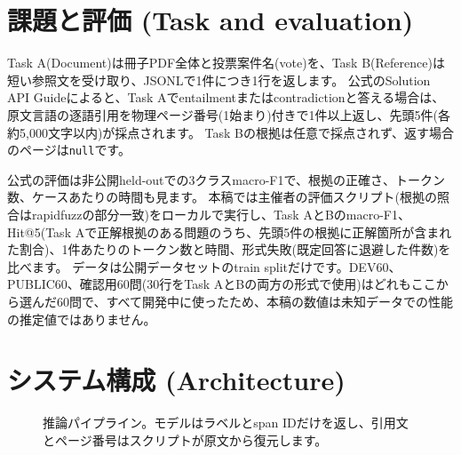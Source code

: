 \documentclass[10pt,a4paper]{ltjsarticle}
\begin{document}
\section{課題と評価 (Task and evaluation)}
\label{sec:eval}

Task A(Document)は冊子PDF全体と投票案件名(vote)を、Task B(Reference)は短い参照文を受け取り、JSONLで1件につき1行を返します。
公式のSolution API Guide\cite{apiguide}によると、Task Aでentailmentまたはcontradictionと答える場合は、原文言語の逐語引用を物理ページ番号(1始まり)付きで1件以上返し、先頭5件(各約5,000文字以内)が採点されます。
Task Bの根拠は任意で採点されず、返す場合のページは\texttt{null}です。

公式の評価は非公開held-outでの3クラスmacro-F1で、根拠の正確さ、トークン数、ケースあたりの時間も見ます\cite{ostchallenge,apiguide}。
本稿では主催者の評価スクリプト(根拠の照合はrapidfuzz\cite{rapidfuzz}の部分一致)をローカルで実行し、Task AとBのmacro-F1、Hit@5(Task Aで正解根拠のある問題のうち、先頭5件の根拠に正解箇所が含まれた割合)、1件あたりのトークン数と時間、形式失敗(既定回答に退避した件数)を比べます。
データは公開データセット\cite{dataset}のtrain splitだけです。DEV60、PUBLIC60、確認用60問(30行をTask AとBの両方の形式で使用)はどれもここから選んだ60問で、すべて開発中に使ったため、本稿の数値は未知データでの性能の推定値ではありません。

\section{システム構成 (Architecture)}

\begin{figure}[t]
  \centering
  \small
  \setlength{\fboxsep}{6pt}
  \caption{推論パイプライン。モデルはラベルとspan IDだけを返し、引用文とページ番号はスクリプトが原文から復元します。}
  \label{fig:pipeline}
\end{figure}
\end{document}
